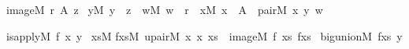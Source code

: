 \begin{isabelle}%
image{\isacharparenleft}{\kern0pt}M{\isacharcomma}{\kern0pt}\ r{\isacharcomma}{\kern0pt}\ A{\isacharcomma}{\kern0pt}\ z{\isacharparenright}{\kern0pt}\ {\isasymequiv}\isanewline
{\isasymforall}y{\isacharbrackleft}{\kern0pt}M{\isacharbrackright}{\kern0pt}{\isachardot}{\kern0pt}\ y\ {\isasymin}\ z\ {\isasymlongleftrightarrow}\ {\isacharparenleft}{\kern0pt}{\isasymexists}w{\isacharbrackleft}{\kern0pt}M{\isacharbrackright}{\kern0pt}{\isachardot}{\kern0pt}\ w\ {\isasymin}\ r\ {\isasymand}\ {\isacharparenleft}{\kern0pt}{\isasymexists}x{\isacharbrackleft}{\kern0pt}M{\isacharbrackright}{\kern0pt}{\isachardot}{\kern0pt}\ x\ {\isasymin}\ A\ {\isasymand}\ pair{\isacharparenleft}{\kern0pt}M{\isacharcomma}{\kern0pt}\ x{\isacharcomma}{\kern0pt}\ y{\isacharcomma}{\kern0pt}\ w{\isacharparenright}{\kern0pt}{\isacharparenright}{\kern0pt}{\isacharparenright}{\kern0pt}%
\end{isabelle}%
\begin{isabelle}%
is{\isacharunderscore}{\kern0pt}apply{\isacharparenleft}{\kern0pt}M{\isacharcomma}{\kern0pt}\ f{\isacharcomma}{\kern0pt}\ x{\isacharcomma}{\kern0pt}\ y{\isacharparenright}{\kern0pt}\ {\isasymequiv}\isanewline
{\isasymexists}xs{\isacharbrackleft}{\kern0pt}M{\isacharbrackright}{\kern0pt}{\isachardot}{\kern0pt}\isanewline
\isaindent{\ \ \ }{\isasymexists}fxs{\isacharbrackleft}{\kern0pt}M{\isacharbrackright}{\kern0pt}{\isachardot}{\kern0pt}\ upair{\isacharparenleft}{\kern0pt}M{\isacharcomma}{\kern0pt}\ x{\isacharcomma}{\kern0pt}\ x{\isacharcomma}{\kern0pt}\ xs{\isacharparenright}{\kern0pt}\ {\isasymand}\ image{\isacharparenleft}{\kern0pt}M{\isacharcomma}{\kern0pt}\ f{\isacharcomma}{\kern0pt}\ xs{\isacharcomma}{\kern0pt}\ fxs{\isacharparenright}{\kern0pt}\ {\isasymand}\isanewline
\isaindent{\ \ \ \ \ }big{\isacharunderscore}{\kern0pt}union{\isacharparenleft}{\kern0pt}M{\isacharcomma}{\kern0pt}\ fxs{\isacharcomma}{\kern0pt}\ y{\isacharparenright}{\kern0pt}%
\end{isabelle}%
